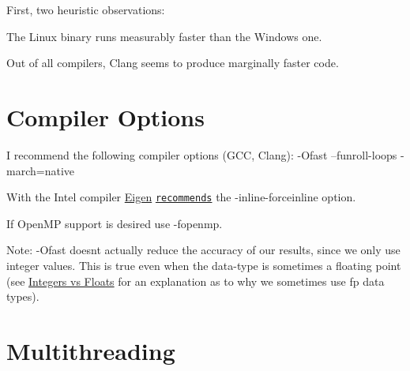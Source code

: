 First, two heuristic observations\+:


\begin{DoxyItemize}
\item The Linux binary runs measurably faster than the Windows one.
\item Out of all compilers, Clang seems to produce marginally faster code.
\end{DoxyItemize}\hypertarget{perf_compoptions}{}\section{Compiler Options}\label{perf_compoptions}

\begin{DoxyItemize}
\item I recommend the following compiler options (G\+CC, Clang)\+: {\ttfamily -\/\+Ofast --funroll-\/loops -\/march=native }
\item With the Intel compiler \hyperlink{namespaceEigen}{Eigen} \href{ http://eigen.tuxfamily.org/index.php?title=Main_Page#Compiler_support}{\tt recommends} the {\ttfamily -\/inline-\/forceinline} option.
\item If Open\+MP support is desired use {\ttfamily -\/fopenmp}.
\item Note\+: {\ttfamily -\/\+Ofast} doesn\textquotesingle{}t actually reduce the accuracy of our results, since we only use integer values. This is true even when the data-\/type is sometimes a floating point (see \hyperlink{perf_intvsfloat}{Integers vs Floats} for an explanation as to why we sometimes use fp data types).
\end{DoxyItemize}\hypertarget{perf_thread}{}\section{Multithreading}\label{perf_thread}

